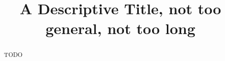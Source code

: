 \documentclass[letterpaper]{article}
\title{A Descriptive Title, not too general, not too long}
\begin{document}
\maketitle

\begin{abstract}
  TODO
\end{abstract}










\end{document}
